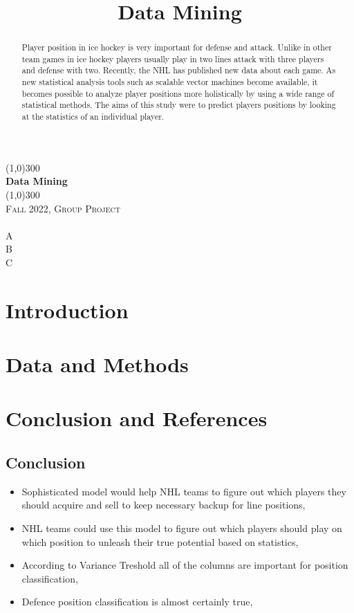 \documentclass{report}
\title{Data Mining}
\begin{document}
\begin{titlepage}
	\begin{center}
    \line(1,0){300}\\
    [0.65cm]
	\huge{\bfseries Data Mining}\\
	\line(1,0){300}\\
	\textsc{\Large Fall 2022, Group Project}\\
	\textsc{\\\small A\\B\\C\\}     
	\end{center}
\end{titlepage}

\begin{abstract}
\par Player position in ice hockey is very important for defense and attack. Unlike in other team games in 
ice hockey players usually play in two lines attack with three players and defense with two. Recently, the NHL has 
published new data about each game. As new statistical analysis tools such as scalable vector
machines become available, it becomes possible to analyze player positions more holistically by using a wide
range of statistical methods. The aims of this study were to predict players positions by looking at 
the statistics of an individual player.
\end{abstract}

\tableofcontents

\chapter{Introduction}
    

\chapter{Data and Methods}
	
	
\chapter{Conclusion and References}
	\section{Conclusion}
		\begin{itemize}
			\item Sophisticated model would help NHL teams to figure out which players they should acquire and sell to keep necessary backup for line positions,
			\item NHL teams could use this model to figure out which players should play on which position to unleash their true potential based on statistics,
			\item According to Variance Treshold all of the columns are important for position classification,
			\item Defence position classification is almost certainly true,
		\end{itemize}
\end{document}
